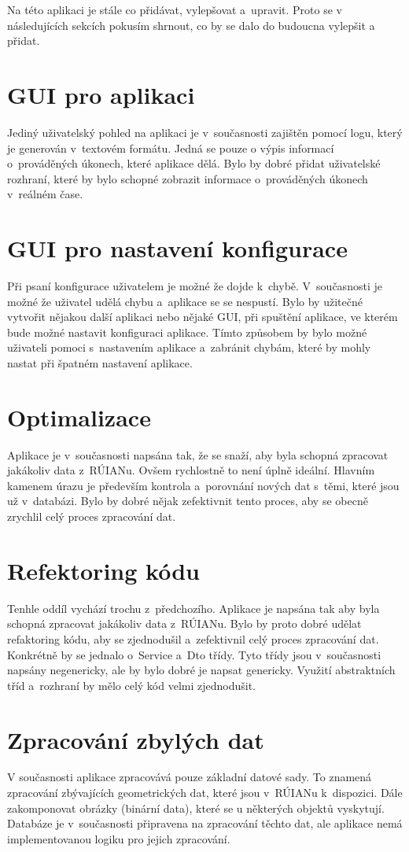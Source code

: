 \label{cha:NavrhDoBudoucna}
Na této aplikaci je stále co přidávat, vylepšovat a~upravit.
Proto se v následujících sekcích pokusím shrnout, co by se 
dalo do budoucna vylepšit a přidat.

\section*{GUI pro aplikaci}
Jediný uživatelský pohled na aplikaci je v~současnosti zajištěn pomocí 
logu, který je generován v~textovém formátu. Jedná se pouze o výpis
informací o~prováděných úkonech, které aplikace dělá.
Bylo by dobré přidat uživatelské rozhraní, které by bylo schopné
zobrazit informace o~prováděných úkonech v~reálném čase.

\section*{GUI pro nastavení konfigurace}
Při psaní konfigurace uživatelem je možné že dojde k~chybě.
V~současnosti je možné že uživatel udělá chybu a~aplikace se 
se nespustí. Bylo by užitečné vytvořit nějakou další aplikaci nebo nějaké GUI,
při spuštění aplikace, ve kterém bude možné nastavit konfiguraci aplikace.
Tímto způsobem by bylo možné uživateli pomoci s~nastavením aplikace
a~zabránit chybám, které by mohly nastat při špatném nastavení aplikace.

\section*{Optimalizace}
Aplikace je v~současnosti napsána tak, že se snaží, aby byla schopná
zpracovat jakákoliv data z~RÚIANu. Ovšem rychlostně to není
úplně ideální. Hlavním kamenem úrazu je především kontrola
a~porovnání nových dat s~těmi, které jsou už v~databázi.
Bylo by dobré nějak zefektivnit tento proces, aby se obecně zrychlil
celý proces zpracování dat.

\section*{Refektoring kódu}
Tenhle oddíl vychází trochu z~předchozího. Aplikace je napsána
tak aby byla schopná zpracovat jakákoliv data z~RÚIANu.
Bylo by proto dobré udělat refaktoring kódu, aby se zjednodušil
a~zefektivnil celý proces zpracování dat. Konkrétně by se jednalo
o~Service a~Dto třídy. Tyto třídy jsou v~současnosti napsány
negenericky, ale by bylo dobré je napsat genericky.
Využití abstraktních tříd a~rozhraní by mělo celý kód velmi
zjednodušit.

\section*{Zpracování zbylých dat}
V současnosti aplikace zpracovává pouze základní datové sady.
To znamená zpracování zbývajících geometrických dat, které jsou
v~RÚIANu k~dispozici. Dále zakomponovat obrázky (binární data),
které se u některých objektů vyskytují.
Databáze je v~současnosti připravena na zpracování těchto dat,
ale aplikace nemá implementovanou logiku pro jejich zpracování.